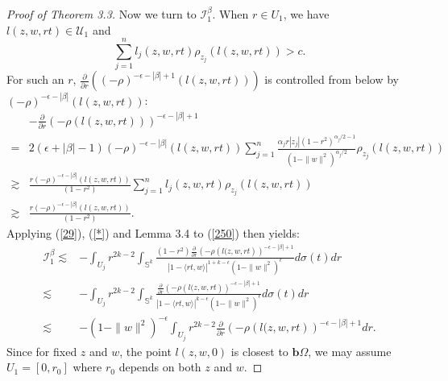 \documentclass[reqno,12pt]{amsart}
\numberwithin{equation}{section}
\begin{document}
\begin{proof}[Proof of Theorem 3.3]
			Now we turn to $\mathcal I^\beta_1$. When $r\in U_1$, we have $l(z,w,rt)\in \mathcal U_1$ and 
			\begin{equation}
			\sum_{j=1}^{n}l_j(z,w,rt)\rho_{z_j}(l(z,w,rt))>c.
			\end{equation}
			For such an $r$, $\frac{\partial}{\partial r} \left((-\rho)^{-\epsilon-|\beta|+1}(l(z,w,rt))\right)$ is controlled from below by $(-\rho)^{-\epsilon-|\beta|}(l(z,w,rt))$:
			\begin{align}\label{29}
			&-\frac{\partial}{\partial r}(-\rho(l(z,w,rt)))^{-\epsilon-|\beta|+1}\nonumber\\=&2(\epsilon+|\beta|-1)(-\rho)^{-\epsilon-|\beta|}(l(z,w,rt))\sum_{j=1}^{n}\frac{\alpha_jr|z_j|(1-r^2)^{\alpha_j/2-1}}{(1-\|w\|^2)^{\alpha_j/2}}\rho_{z_j}(l(z,w,rt))\nonumber\\\gtrsim&\frac{r(-\rho)^{-\epsilon-|\beta|}(l(z,w,rt))}{(1-r^2)}\sum_{j=1}^nl_j(z,w,rt)\rho_{z_j}(l(z,w,rt))\nonumber\\\gtrsim&\frac{r(-\rho)^{-\epsilon-|\beta|}(l(z,w,rt))}{(1-r^2)}.
			\end{align}
			Applying (\ref{29}), (\ref{*}) and Lemma 3.4 to (\ref{250}) then yields:
			\begin{align}\label{253}
			\mathcal I^{\beta}_1\lesssim&-\int_{U_j}r^{2k-2}\int_{\mathbb S^k}\frac{(1-r^2)\frac{\partial}{\partial r}\left(-\rho\left(l(z,w,r t\right)\right)^{-\epsilon-|\beta|+1}}{|1-\langle rt,w\rangle|^{1+k-\epsilon}(1-\|w\|^2)^{\epsilon}}d\sigma (t)dr\nonumber
			\\\lesssim&-\int_{U_j}r^{2k-2}\int_{\mathbb S^k}\frac{\frac{\partial}{\partial r}\left(-\rho\left(l(z,w,r t\right)\right)^{-\epsilon-|\beta|+1}}{|1-\langle rt,w\rangle|^{k-\epsilon}(1-\|w\|^2)^{\epsilon}}d\sigma (t)dr\nonumber
			\\\lesssim&-(1-\|w\|^2)^{-\epsilon}\int_{U_j}r^{2k-2}{\frac{\partial}{\partial r}\left(-\rho\left(l(z,w,r t\right)\right)^{-\epsilon-|\beta|+1}}dr.
			\end{align}
			Since for fixed $z$ and $w$, the point $l(z,w,0)$ is closest to $\mathbf b\Omega$, we may assume $U_1=[0,r_0]$ where $r_0$ depends on both $z$ and $w$.
			

\end{proof}
\end{document}

